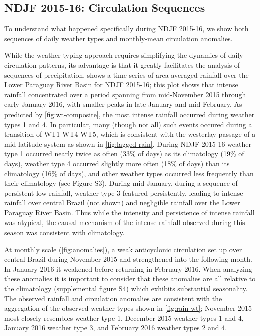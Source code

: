 \documentclass[twocol]{ametsoc}
\begin{document}
\subsection{NDJF 2015-16: Circulation Sequences}

To understand what happened specifically during NDJF 2015-16, we show both sequences of daily weather types and monthly-mean circulation anomalies.

While the weather typing approach requires simplifying the dynamics of daily circulation patterns, its advantage is that it greatly facilitates the analysis of sequences of precipitation.
 shows a time series of area-averaged rainfall over the Lower Paraguay River Basin for NDJF 2015-16; this plot shows that intense rainfall concentrated over a period spanning from mid-November 2015 through early January 2016, with smaller peaks in late January and mid-February.
As predicted by \cref{fig:wt-composite}, the most intense rainfall occurred during weather types 1 and 4.
In particular, many (though not all) such events occured during a transition of WT1-WT4-WT5, which is consistent with the westerlay passage of a mid-latitude system as shown in \cref{fig:lagged-rain}.
During NDJF 2015-16 weather type 1 occurred nearly twice as often (33\% of days) as its climatology (19\% of days), weather type 4 occurred slightly more often (18\% of days) than its climatology (16\% of days), and other weather types occurred less frequently than their climatology (see Figure S3).
During mid-January, during a sequence of persistent low rainfall, weather type 3 featured persistently, leading to intense rainfall over central Brazil (not shown) and negligible rainfall over the Lower Paraguay River Basin.
Thus while the intensity and persistence of intense rainfall was atypical, the causal mechanism of the intense rainfall observed during this season was consistent with climatology.

At monthly scale (\cref{fig:anomalies}), a weak anticyclonic circulation set up over central Brazil during November 2015 and strengthened into the following month.
In January 2016 it weakened before returning in February 2016.
When analyzing these anomalies it is important to consider that these anomalies are all relative to the climatology (supplemental figure S4) which exhibits substantial seasonality.
The observed rainfall and circulation anomalies are consistent with the aggregation of the observed weather types shown in \cref{fig:rain-wt}; November 2015 most closely resembles weather type 1, December 2015 weather types 1 and 4, January 2016 weather type
3, and February 2016 weather types 2 and 4.
\end{document}
